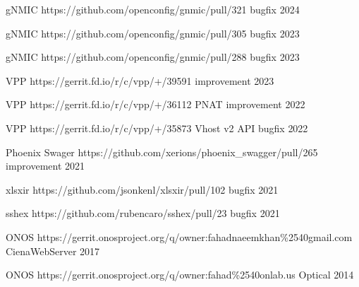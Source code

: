 

\begin{cvhonors}


  \cvhonor
    {gNMIC} %
    {https://github.com/openconfig/gnmic/pull/321}
    {bugfix} %
    {2024} %

  \cvhonor
    {gNMIC} %
    {https://github.com/openconfig/gnmic/pull/305}
    {bugfix} %
    {2023} %

  \cvhonor
    {gNMIC} %
    {https://github.com/openconfig/gnmic/pull/288}
    {bugfix} %
    {2023} %

  \cvhonor
    {VPP} %
    {https://gerrit.fd.io/r/c/vpp/+/39591}
    {improvement} %
    {2023} %

  \cvhonor
    {VPP} %
    {https://gerrit.fd.io/r/c/vpp/+/36112}
    {PNAT improvement} %
    {2022} %

  \cvhonor
    {VPP} %
    {https://gerrit.fd.io/r/c/vpp/+/35873}
    {Vhost v2 API bugfix} %
    {2022} %

  \cvhonor
    {Phoenix Swager} %
    {https://github.com/xerions/phoenix\_swagger/pull/265}
    {improvement} %
    {2021} %

  \cvhonor
    {xlsxir} %
    {https://github.com/jsonkenl/xlsxir/pull/102}
    {bugfix} %
    {2021} %

  \cvhonor
    {sshex} %
    {https://github.com/rubencaro/sshex/pull/23}
    {bugfix} %
    {2021} %

  \cvhonor
    {ONOS} %
    {https://gerrit.onosproject.org/q/owner:fahadnaeemkhan\%2540gmail.com}
    {CienaWebServer} %
    {2017} %

  \cvhonor
    {ONOS} %
    {https://gerrit.onosproject.org/q/owner:fahad\%2540onlab.us}
    {Optical} %
    {2014} %

\end{cvhonors}
